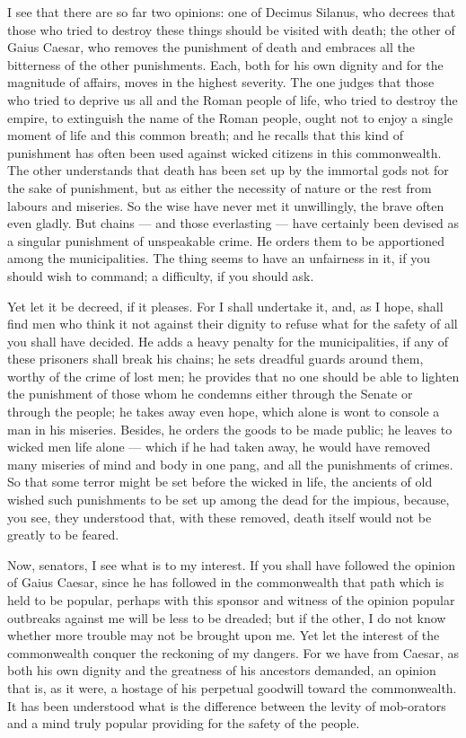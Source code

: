  I see that there are so far two opinions: one of Decimus Silanus, who decrees that those who tried to destroy these things should be visited with death; the other of Gaius Caesar, who removes the punishment of death and embraces all the bitterness of the other punishments. Each, both for his own dignity and for the magnitude of affairs, moves in the highest severity. The one judges that those who tried to deprive us all and the Roman people of life, who tried to destroy the empire, to extinguish the name of the Roman people, ought not to enjoy a single moment of life and this common breath; and he recalls that this kind of punishment has often been used against wicked citizens in this commonwealth. The other understands that death has been set up by the immortal gods not for the sake of punishment, but as either the necessity of nature or the rest from labours and miseries. So the wise have never met it unwillingly, the brave often even gladly. But chains --- and those everlasting --- have certainly been devised as a singular punishment of unspeakable crime. He orders them to be apportioned among the municipalities. The thing seems to have an unfairness in it, if you should wish to command; a difficulty, if you should ask.

 Yet let it be decreed, if it pleases. For I shall undertake it, and, as I hope, shall find men who think it not against their dignity to refuse what for the safety of all you shall have decided. He adds a heavy penalty for the municipalities, if any of these prisoners shall break his chains; he sets dreadful guards around them, worthy of the crime of lost men; he provides that no one should be able to lighten the punishment of those whom he condemns either through the Senate or through the people; he takes away even hope, which alone is wont to console a man in his miseries. Besides, he orders the goods to be made public; he leaves to wicked men life alone --- which if he had taken away, he would have removed many miseries of mind and body in one pang, and all the punishments of crimes. So that some terror might be set before the wicked in life, the ancients of old wished such punishments to be set up among the dead for the impious, because, you see, they understood that, with these removed, death itself would not be greatly to be feared.

 Now, senators, I see what is to my interest. If you shall have followed the opinion of Gaius Caesar, since he has followed in the commonwealth that path which is held to be popular, perhaps with this sponsor and witness of the opinion popular outbreaks against me will be less to be dreaded; but if the other, I do not know whether more trouble may not be brought upon me. Yet let the interest of the commonwealth conquer the reckoning of my dangers. For we have from Caesar, as both his own dignity and the greatness of his ancestors demanded, an opinion that is, as it were, a hostage of his perpetual goodwill toward the commonwealth. It has been understood what is the difference between the levity of mob-orators and a mind truly popular providing for the safety of the people.

